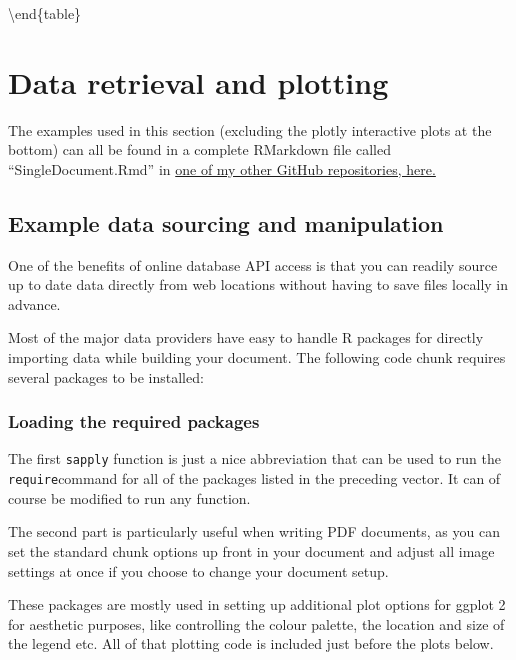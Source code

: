 \documentclass[
]{book}
\begin{document}
\textbackslash end\{table\}

\hypertarget{data-retrieval-and-plotting-1}{%
\chapter{Data retrieval and plotting}\label{data-retrieval-and-plotting-1}}

The examples used in this section (excluding the plotly interactive plots at the bottom) can all be found in a complete RMarkdown file called ``SingleDocument.Rmd'' in \href{https://github.com/robabsmith/Rmarkdown-project-template}{one of my other GitHub repositories, here.}

\hypertarget{example-data-sourcing-and-manipulation}{%
\section{Example data sourcing and manipulation}\label{example-data-sourcing-and-manipulation}}

One of the benefits of online database API access is that you can readily source up to date data directly from web locations without having to save files locally in advance.

Most of the major data providers have easy to handle R packages for directly importing data while building your document. The following code chunk requires several packages to be installed:

\hypertarget{loading-the-required-packages}{%
\subsection{Loading the required packages}\label{loading-the-required-packages}}

The first \texttt{sapply} function is just a nice abbreviation that can be used to run the \texttt{require}command for all of the packages listed in the preceding vector. It can of course be modified to run any function.

The second part is particularly useful when writing PDF documents, as you can set the standard chunk options up front in your document and adjust all image settings at once if you choose to change your document setup.

These packages are mostly used in setting up additional plot options for ggplot 2 for aesthetic purposes, like controlling the colour palette, the location and size of the legend etc. All of that plotting code is included just before the plots below.
\end{document}
